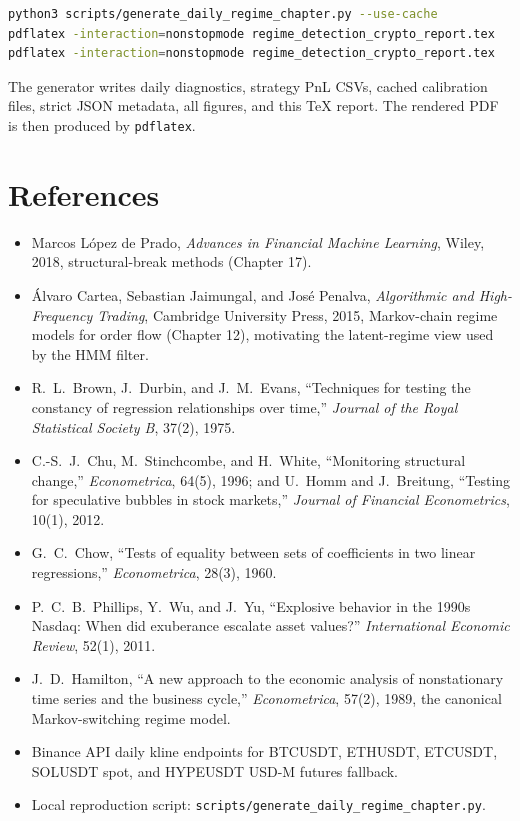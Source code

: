 \documentclass[11pt]{article}
\begin{document}
\begin{lstlisting}[language=bash]
python3 scripts/generate_daily_regime_chapter.py --use-cache
pdflatex -interaction=nonstopmode regime_detection_crypto_report.tex
pdflatex -interaction=nonstopmode regime_detection_crypto_report.tex
\end{lstlisting}

The generator writes daily diagnostics, strategy PnL CSVs, cached calibration files, strict JSON metadata, all figures, and this TeX report. The rendered PDF is then produced by \texttt{pdflatex}.

\section{References}

\begin{itemize}
    \item Marcos L\'opez de Prado, \emph{Advances in Financial Machine Learning}, Wiley, 2018, structural-break methods (Chapter 17).
    \item \'Alvaro Cartea, Sebastian Jaimungal, and Jos\'e Penalva, \emph{Algorithmic and High-Frequency Trading}, Cambridge University Press, 2015, Markov-chain regime models for order flow (Chapter 12), motivating the latent-regime view used by the HMM filter.
    \item R.~L.~Brown, J.~Durbin, and J.~M.~Evans, ``Techniques for testing the constancy of regression relationships over time,'' \emph{Journal of the Royal Statistical Society B}, 37(2), 1975.
    \item C.-S.~J.~Chu, M.~Stinchcombe, and H.~White, ``Monitoring structural change,'' \emph{Econometrica}, 64(5), 1996; and U.~Homm and J.~Breitung, ``Testing for speculative bubbles in stock markets,'' \emph{Journal of Financial Econometrics}, 10(1), 2012.
    \item G.~C.~Chow, ``Tests of equality between sets of coefficients in two linear regressions,'' \emph{Econometrica}, 28(3), 1960.
    \item P.~C.~B.~Phillips, Y.~Wu, and J.~Yu, ``Explosive behavior in the 1990s Nasdaq: When did exuberance escalate asset values?'' \emph{International Economic Review}, 52(1), 2011.
    \item J.~D.~Hamilton, ``A new approach to the economic analysis of nonstationary time series and the business cycle,'' \emph{Econometrica}, 57(2), 1989, the canonical Markov-switching regime model.
    \item Binance API daily kline endpoints for BTCUSDT, ETHUSDT, ETCUSDT, SOLUSDT spot, and HYPEUSDT USD-M futures fallback.
    \item Local reproduction script: \texttt{scripts/generate\_daily\_regime\_chapter.py}.
\end{itemize}
\end{document}
